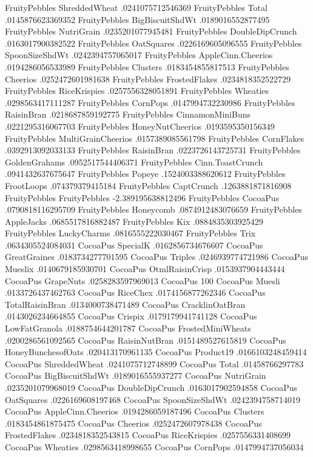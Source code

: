 FruityPebbles	ShreddedWheat	.0241075712546369
FruityPebbles	Total	.0145876623369352
FruityPebbles	BigBiscuitShdWt	.0189016552877495
FruityPebbles	NutriGrain	.0235201077945481
FruityPebbles	DoubleDipCrunch	.0163017900382522
FruityPebbles	OatSquares	.0226169605096555
FruityPebbles	SpoonSizeShdWt	.0242394757065017
FruityPebbles	AppleCinn.Cheerios	.0194286056533989
FruityPebbles	Clusters	.0183454855817513
FruityPebbles	Cheerios	.0252472601981638
FruityPebbles	FrostedFlakes	.0234818352522729
FruityPebbles	RiceKrispies	.0257556328051891
FruityPebbles	Wheaties	.0298563417111287
FruityPebbles	CornPops	.0147994732230986
FruityPebbles	RaisinBran	.0218687859192775
FruityPebbles	CinnamonMiniBuns	.0221295316067703
FruityPebbles	HoneyNutCheerios	.0193595350156349
FruityPebbles	MultiGrainCheerios	.0157389085561798
FruityPebbles	CornFlakes	.0392913092033133
FruityPebbles	RaisinBran	.0223726143725731
FruityPebbles	GoldenGrahams	.0952517544406371
FruityPebbles	Cinn.ToastCrunch	.0941432637675647
FruityPebbles	Popeye	.1524003388620612
FruityPebbles	FrootLoops	.074379379415184
FruityPebbles	CaptCrunch	.1263881871816908
FruityPebbles	FruityPebbles	-2.389195638812496
FruityPebbles	CocoaPus	.0790818116295709
FruityPebbles	Honeycomb	.0874912483076659
FruityPebbles	AppleJacks	.0685517816882487
FruityPebbles	Kix	.0884835303925429
FruityPebbles	LuckyCharms	.0816555222030467
FruityPebbles	Trix	.0634305524084031
CocoaPus	SpecialK	.0162856734676607
CocoaPus	GreatGraines	.0183734277701595
CocoaPus	Triples	.0246939774721986
CocoaPus	Mueslix	.0140679185930701
CocoaPus	OtmlRaisinCrisp	.0153937904443444
CocoaPus	GrapeNuts	.0258283597969013
CocoaPus	100%
CocoaPus	Muesli	.0133726437462763
CocoaPus	RiceChex	.0174156877262346
CocoaPus	TotalRaisinBran	.0134000738471489
CocoaPus	CracklinOatBran	.0143026234664855
CocoaPus	Crispix	.0179179941741128
CocoaPus	LowFatGranola	.0188754644201787
CocoaPus	FrostedMiniWheats	.0200286561092565
CocoaPus	RaisinNutBran	.0151489527615819
CocoaPus	HoneyBunchesofOats	.020413170961135
CocoaPus	Product19	.0166103248459414
CocoaPus	ShreddedWheat	.0241075712748899
CocoaPus	Total	.01458766297783
CocoaPus	BigBiscuitShdWt	.0189016555937277
CocoaPus	NutriGrain	.0235201079968019
CocoaPus	DoubleDipCrunch	.0163017902594858
CocoaPus	OatSquares	.0226169608197468
CocoaPus	SpoonSizeShdWt	.0242394758714019
CocoaPus	AppleCinn.Cheerios	.0194286059187496
CocoaPus	Clusters	.0183454861875475
CocoaPus	Cheerios	.0252472607978438
CocoaPus	FrostedFlakes	.0234818352543815
CocoaPus	RiceKrispies	.0257556331408699
CocoaPus	Wheaties	.0298563418998655
CocoaPus	CornPops	.0147994737056034
